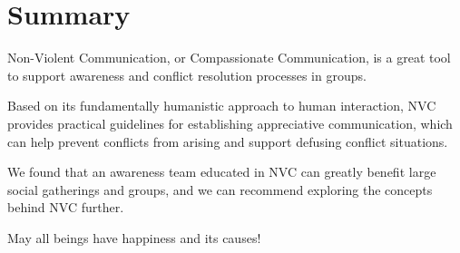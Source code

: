 %
%

\pagebreak
\section{Summary}

\onehalfspacing

Non-Violent Communication, or Compassionate Communication, is a great tool to support awareness and conflict resolution processes in groups.

Based on its fundamentally humanistic approach to human interaction, NVC provides practical guidelines for establishing appreciative communication, which can help prevent conflicts from arising and support defusing conflict situations.

We found that an awareness team educated in NVC can greatly benefit large social gatherings and groups, and we can recommend exploring the concepts behind NVC further.

May all beings have happiness and its causes!
